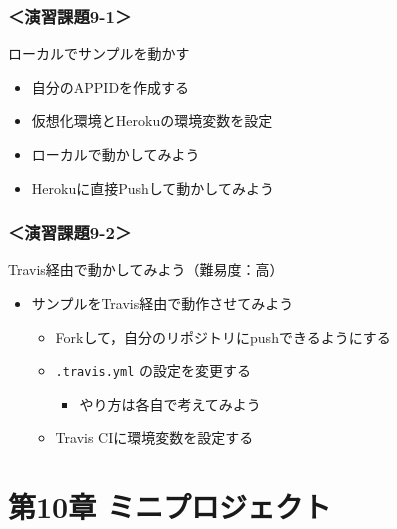 \documentclass[t, aspectratio=169]{beamer}
\begin{document}
\section{＜演習課題9-1＞}
\label{sec-9-4}
\begin{frame}[label=sec-9-4-1]{ローカルでサンプルを動かす}
\begin{itemize}
\item 自分のAPPIDを作成する
\item 仮想化環境とHerokuの環境変数を設定
\item ローカルで動かしてみよう
\item Herokuに直接Pushして動かしてみよう
\end{itemize}
\end{frame}

\section{＜演習課題9-2＞}
\label{sec-9-5}
\begin{frame}[fragile,label=sec-9-5-1]{Travis経由で動かしてみよう（難易度：高）}
 \begin{itemize}
\item サンプルをTravis経由で動作させてみよう
\begin{itemize}
\item Forkして，自分のリポジトリにpushできるようにする
\item \texttt{.travis.yml} の設定を変更する
\begin{itemize}
\item やり方は各自で考えてみよう
\end{itemize}
\item Travis CIに環境変数を設定する
\end{itemize}
\end{itemize}
\end{frame}
\part{第10章 ミニプロジェクト}
\label{sec-10}
\end{document}
